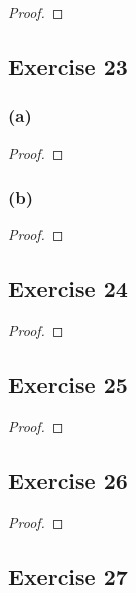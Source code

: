 \documentclass[14pt]{extarticle}
\begin{document}
\begin{proof}

\end{proof}

\subsection{Exercise 23}

\subsubsection{(a)}

\begin{proof}

\end{proof}

\subsubsection{(b)}

\begin{proof}

\end{proof}

\subsection{Exercise 24}

\begin{proof}

\end{proof}

\subsection{Exercise 25}

\begin{proof}

\end{proof}

\subsection{Exercise 26}

\begin{proof}

\end{proof}

\subsection{Exercise 27}
\end{document}
